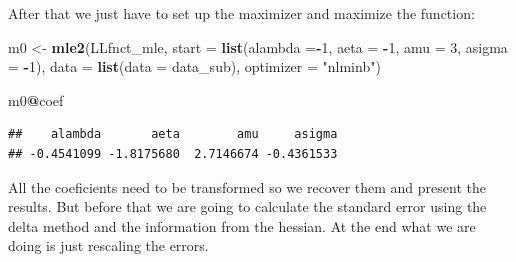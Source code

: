 \documentclass[]{book}
\newenvironment{Shaded}{\begin{snugshade}}{\end{snugshade}}
\newcommand{\KeywordTok}[1]{\textcolor[rgb]{0.13,0.29,0.53}{\textbf{#1}}}
\newcommand{\DataTypeTok}[1]{\textcolor[rgb]{0.13,0.29,0.53}{#1}}
\newcommand{\DecValTok}[1]{\textcolor[rgb]{0.00,0.00,0.81}{#1}}
\newcommand{\StringTok}[1]{\textcolor[rgb]{0.31,0.60,0.02}{#1}}
\newcommand{\OperatorTok}[1]{\textcolor[rgb]{0.81,0.36,0.00}{\textbf{#1}}}
\newcommand{\NormalTok}[1]{#1}
\begin{document}
After that we just have to set up the maximizer and maximize the
function:

\begin{Shaded}
\begin{Highlighting}[]
\NormalTok{m0 <-}\StringTok{ }\KeywordTok{mle2}\NormalTok{(LLfnct_mle, }
           \DataTypeTok{start =} \KeywordTok{list}\NormalTok{(}\DataTypeTok{alambda =}\OperatorTok{-}\DecValTok{1}\NormalTok{,}
                        \DataTypeTok{aeta =} \OperatorTok{-}\DecValTok{1}\NormalTok{, }
                        \DataTypeTok{amu =} \DecValTok{3}\NormalTok{,}
                        \DataTypeTok{asigma =} \OperatorTok{-}\DecValTok{1}\NormalTok{), }
           \DataTypeTok{data =} \KeywordTok{list}\NormalTok{(}\DataTypeTok{data =}\NormalTok{ data_sub),}
           \DataTypeTok{optimizer =} \StringTok{"nlminb"}\NormalTok{)}

\NormalTok{m0}\OperatorTok{@}\NormalTok{coef}
\end{Highlighting}
\end{Shaded}

\begin{verbatim}
##    alambda       aeta        amu     asigma 
## -0.4541099 -1.8175680  2.7146674 -0.4361533
\end{verbatim}

All the coeficients need to be transformed so we recover them and
present the results. But before that we are going to calculate the
standard error using the delta method and the information from the
hessian. At the end what we are doing is just rescaling the errors.

\begin{Shaded}
\end{Shaded}
\end{document}
